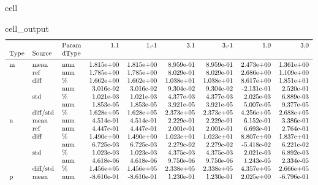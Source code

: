 \documentclass[letterpaper,table,10pt,english]{jupyterBook}
\begin{document}
\begin{sphinxuseclass}{cell}
\begin{sphinxVerbatimOutput}
\begin{sphinxuseclass}{cell_output}\begin{equation*}
\begin{split}\begin{tabular}{lllrrrrrr}
\toprule
   &          & Param &        1,1 &       1,-1 &        3,1 &       3,-1 &        1,0 &        3,0 \\
Type & Source & dType &            &            &            &            &            &            \\
\midrule
m & mean & num &  1.815e+00 &  1.815e+00 &  8.959e-01 &  8.959e-01 &  2.473e+00 &  1.361e+00 \\
   & ref & num &  1.785e+00 &  1.785e+00 &  8.029e-01 &  8.029e-01 &  2.686e+00 &  1.109e+00 \\
   & diff & \% &  1.662e+00 &  1.662e+00 &  1.038e+01 &  1.038e+01 &  8.617e+00 &  1.851e+01 \\
   &          & num &  3.016e-02 &  3.016e-02 &  9.304e-02 &  9.304e-02 & -2.131e-01 &  2.520e-01 \\
   & std & \% &  1.021e-03 &  1.021e-03 &  4.377e-03 &  4.377e-03 &  2.025e-03 &  6.889e-03 \\
   &          & num &  1.853e-05 &  1.853e-05 &  3.921e-05 &  3.921e-05 &  5.007e-05 &  9.377e-05 \\
   & diff/std & \% &  1.628e+05 &  1.628e+05 &  2.373e+05 &  2.373e+05 &  4.256e+05 &  2.688e+05 \\
n & mean & num &  4.514e-01 &  4.514e-01 &  2.229e-01 &  2.229e-01 &  6.152e-01 &  3.386e-01 \\
   & ref & num &  4.447e-01 &  4.447e-01 &  2.001e-01 &  2.001e-01 &  6.693e-01 &  2.764e-01 \\
   & diff & \% &  1.490e+00 &  1.490e+00 &  1.023e+01 &  1.023e+01 &  8.807e+00 &  1.837e+01 \\
   &          & num &  6.725e-03 &  6.725e-03 &  2.279e-02 &  2.279e-02 & -5.418e-02 &  6.221e-02 \\
   & std & \% &  1.023e-03 &  1.023e-03 &  4.375e-03 &  4.375e-03 &  2.021e-03 &  6.892e-03 \\
   &          & num &  4.618e-06 &  4.618e-06 &  9.750e-06 &  9.750e-06 &  1.243e-05 &  2.334e-05 \\
   & diff/std & \% &  1.456e+05 &  1.456e+05 &  2.338e+05 &  2.338e+05 &  4.357e+05 &  2.666e+05 \\
p & mean & num & -8.610e-01 & -8.610e-01 &  1.230e-01 &  1.230e-01 &  2.025e+00 & -6.796e-01 \\

\end{tabular}
\end{split}
\end{equation*}
\end{sphinxuseclass}
\end{sphinxVerbatimOutput}
\end{sphinxuseclass}
\end{document}
